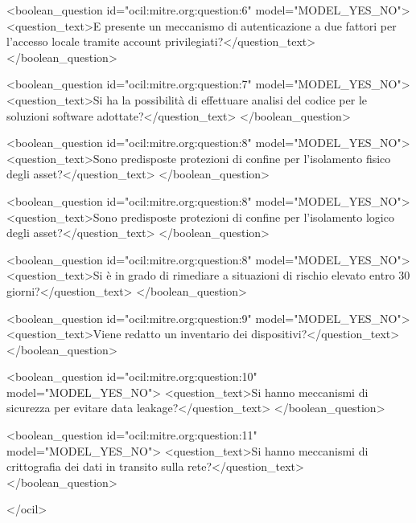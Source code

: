 \begin{xml}
  <boolean_question id="ocil:mitre.org:question:6" model="MODEL_YES_NO">
    <question_text>E presente un meccanismo di autenticazione a due fattori per l'accesso locale tramite account privilegiati?</question_text>
  </boolean_question>

  <boolean_question id="ocil:mitre.org:question:7" model="MODEL_YES_NO">
    <question_text>Si ha la possibilit\`a di effettuare analisi del codice per le soluzioni software adottate?</question_text>
  </boolean_question>

  <boolean_question id="ocil:mitre.org:question:8" model="MODEL_YES_NO">
    <question_text>Sono predisposte protezioni di confine per l'isolamento fisico degli asset?</question_text>
  </boolean_question>

  <boolean_question id="ocil:mitre.org:question:8" model="MODEL_YES_NO">
    <question_text>Sono predisposte protezioni di confine per l'isolamento logico degli asset?</question_text>
  </boolean_question>

  <boolean_question id="ocil:mitre.org:question:8" model="MODEL_YES_NO">
    <question_text>Si \`e in grado di rimediare a situazioni di rischio elevato entro 30 giorni?</question_text>
  </boolean_question>

  <boolean_question id="ocil:mitre.org:question:9" model="MODEL_YES_NO">
    <question_text>Viene redatto un inventario dei dispositivi?</question_text>
  </boolean_question>

  <boolean_question id="ocil:mitre.org:question:10" model="MODEL_YES_NO">
    <question_text>Si hanno meccanismi di sicurezza per evitare data leakage?</question_text>
  </boolean_question>

  <boolean_question id="ocil:mitre.org:question:11" model="MODEL_YES_NO">
    <question_text>Si hanno meccanismi di crittografia dei dati in transito sulla rete?</question_text>
  </boolean_question>

</ocil>

\end{xml}
\label{appendix:readiness}
